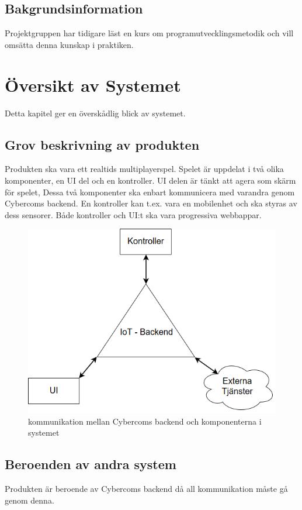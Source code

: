 \documentclass[10pt]{article}
\begin{document}
	\subsection{Bakgrundsinformation}
		Projektgruppen har tidigare läst en kurs om programutvecklingsmetodik och vill omsätta denna kunskap i praktiken. 
		
\pagebreak
\section{Översikt av Systemet}
	Detta kapitel ger en överskådlig blick av systemet.

	\subsection{Grov beskrivning av produkten}
	Produkten ska vara ett realtids multiplayerspel. Spelet är uppdelat i två olika komponenter, en UI del och en kontroller. UI delen är tänkt att agera som skärm för spelet,  Dessa två komponenter ska enbart kommunicera med varandra genom Cybercoms backend. En kontroller kan t.ex. vara en mobilenhet och ska styras av dess sensorer. Både kontroller och UI:t ska vara progressiva webbappar. 
	
	\begin{figure}[h]
		\centering
		\includegraphics[scale=0.4]{backend}
		\caption{kommunikation mellan Cybercoms backend och komponenterna i systemet}
		\label{fig:backend}
	\end{figure}
	
	
	\subsection{Beroenden av andra system}
	Produkten är beroende av Cybercoms backend då all kommunikation måste gå genom denna. 
\end{document}
